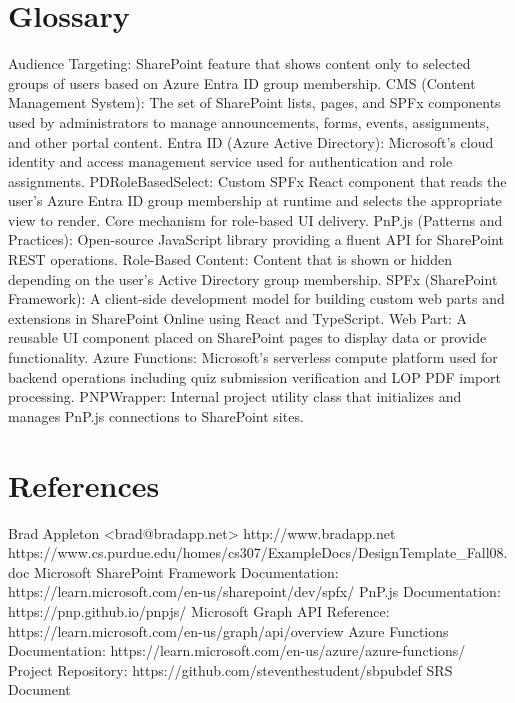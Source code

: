 \documentclass[12pt]{article}
\begin{document}
\section{Glossary}

Audience Targeting: SharePoint feature that shows content only to selected groups of users based on Azure Entra ID group membership. CMS (Content Management System): The set of SharePoint lists, pages, and SPFx components used by administrators to manage announcements, forms, events, assignments, and other portal content. Entra ID (Azure Active Directory): Microsoft's cloud identity and access management service used for authentication and role assignments. PDRoleBasedSelect: Custom SPFx React component that reads the user's Azure Entra ID group membership at runtime and selects the appropriate view to render. Core mechanism for role-based UI delivery. PnP.js (Patterns and Practices): Open-source JavaScript library providing a fluent API for SharePoint REST operations. Role-Based Content: Content that is shown or hidden depending on the user's Active Directory group membership. SPFx (SharePoint Framework): A client-side development model for building custom web parts and extensions in SharePoint Online using React and TypeScript. Web Part: A reusable UI component placed on SharePoint pages to display data or provide functionality. Azure Functions: Microsoft's serverless compute platform used for backend operations including quiz submission verification and LOP PDF import processing. PNPWrapper: Internal project utility class that initializes and manages PnP.js connections to SharePoint sites.

\section{References}

Brad Appleton <brad@bradapp.net> http://www.bradapp.net https://www.cs.purdue.edu/homes/cs307/ExampleDocs/DesignTemplate\_Fall08.doc Microsoft SharePoint Framework Documentation: https://learn.microsoft.com/en-us/sharepoint/dev/spfx/ PnP.js Documentation: https://pnp.github.io/pnpjs/ Microsoft Graph API Reference: https://learn.microsoft.com/en-us/graph/api/overview Azure Functions Documentation: https://learn.microsoft.com/en-us/azure/azure-functions/ Project Repository: https://github.com/steventhestudent/sbpubdef SRS Document
\end{document}
